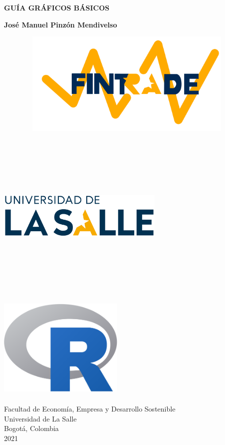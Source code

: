 \begin{titlepage}
    \begin{center}
        \vspace*{1cm}
            
        \Huge
        \textbf{GUÍA GRÁFICOS BÁSICOS}
            
        \vspace{0.5cm}
        \LARGE
        \textbf{José Manuel Pinzón Mendivelso}
				
				\includegraphics[width=13cm,height=5cm]{Fintrade}    
            
            
        \vspace{0.5cm}
										
        \includegraphics[width=8cm,height=8cm]{LOGO}    

        \vspace{1.5cm}

        \includegraphics[width=6cm,height=5cm]{R_Project}
				
				\vfill
						
        \Large
        Facultad de Economía, Empresa y Desarrollo Sostenible\\
        Universidad de La Salle\\
        Bogotá, Colombia\\
        2021
            
    \end{center}
\end{titlepage}
